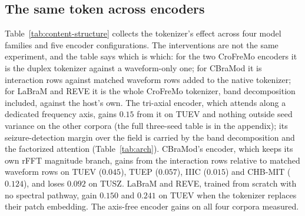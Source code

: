 \subsection{The same token across encoders}
\label{sec:content-structure}

Table~\ref{tab:content-structure} collects the tokenizer's effect across
four model families and five encoder configurations. The interventions are
not the same experiment, and the table says which is which: for the two
CroFreMo encoders it is the duplex tokenizer against a waveform-only one;
for CBraMod it is interaction rows against matched waveform rows added to
the native tokenizer; for LaBraM and REVE it is the whole CroFreMo
tokenizer, band decomposition included, against the host's own. The tri-axial encoder, which attends along a dedicated
frequency axis, gains $0.15$ from it on TUEV and nothing outside seed
variance on the other corpora (the full three-seed table is in the
appendix); its seizure-detection margin over the field is carried by the
band decomposition and the factorized attention (Table~\ref{tab:arch}).
CBraMod's encoder, which keeps its own rFFT magnitude branch, gains from
the interaction rows relative to matched waveform rows on TUEV ($0.045$),
TUEP ($0.057$), IIIC ($0.015$) and CHB-MIT ($0.124$), and loses $0.092$ on
TUSZ. LaBraM and REVE, trained from scratch with no spectral pathway,
gain $0.150$ and $0.241$ on TUEV when the tokenizer replaces their patch
embedding. The axis-free encoder gains on all four corpora measured.

\begin{table}[t]
\centering
\small
\caption{Tokenizer benefit across four model families and five encoder
configurations. The interventions differ and the numbers are not one
quantity: duplex vs.\ waveform-only tokenizer (CroFreMo encoders);
interaction rows vs.\ matched waveform rows added to the native tokenizer
(CBraMod); the whole CroFreMo tokenizer vs.\ the native tokenizer
(LaBraM, REVE). Tri-axial: three seeds; the rest single seeds.}
\label{tab:content-structure}
\end{table}

